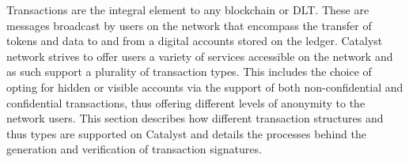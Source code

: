 Transactions are the integral element to any blockchain or DLT. These are messages broadcast by users on the network that encompass the transfer of tokens and data to and from a digital accounts stored on the ledger. Catalyst network strives to offer users a variety of services accessible on the network and as such support a plurality of transaction types. This includes the choice of opting for hidden or visible accounts via the support of both non-confidential and confidential transactions, thus offering different levels of anonymity to the network users. This section describes how different transaction structures and thus types are supported on Catalyst and details the processes behind the generation and verification of transaction signatures. 